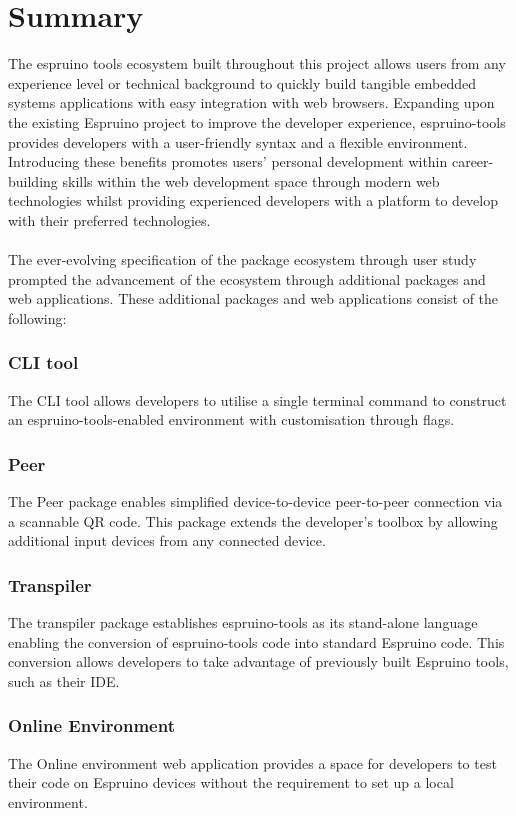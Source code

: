 \documentclass{l4proj}
\begin{document}
\section{Summary}
The espruino tools ecosystem built throughout this project allows users from any experience level or technical background to quickly build tangible embedded systems applications with easy integration with web browsers. Expanding upon the existing Espruino project to improve the developer experience, espruino-tools provides developers with a user-friendly syntax and a flexible environment. Introducing these benefits promotes users' personal development within career-building skills within the web development space through modern web technologies whilst providing experienced developers with a platform to develop with their preferred technologies. 
\\ \\
The ever-evolving specification of the package ecosystem through user study prompted the advancement of the ecosystem through additional packages and web applications. These additional packages and web applications consist of the following: 

\subsubsection{CLI tool} The CLI tool allows developers to utilise a single terminal command to construct an espruino-tools-enabled environment with customisation through flags.
\subsubsection{Peer} The Peer package enables simplified device-to-device peer-to-peer connection via a scannable QR code. This package extends the developer's toolbox by allowing additional input devices from any connected device.
\subsubsection{Transpiler} The transpiler package establishes espruino-tools as its stand-alone language enabling the conversion of espruino-tools code into standard Espruino code. This conversion allows developers to take advantage of previously built Espruino tools, such as their IDE.
\subsubsection{Online Environment} The Online environment web application provides a space for developers to test their code on Espruino devices without the requirement to set up a local environment.
\end{document}
